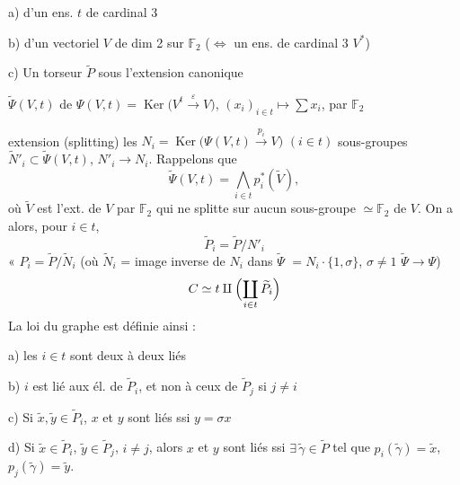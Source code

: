 \documentclass[11pt,a4paper]{article}
\begin{document}
a) d'un \struck{\ill{}} ens. $t$ de cardinal 3

b) d'un vectoriel $V$ de dim 2 sur $\mathbb{F}_2$ ($\Longleftrightarrow$ un
ens. de cardinal 3  $V^{*}$)

c) Un torseur $\widetilde{P}$ sous l'extension canonique


$\widetilde{\Psi}(V, t)$ de
$\Psi(V, t) = \operatorname{Ker}\bigl(V^{t} \xrightarrow{\varepsilon} V\bigr)$,
$(x_i)_{i \in t} \mapsto \sum x_i$, par $\mathbb{F}_2$

\ill{} extension  (splitting)  les
$N_i = \operatorname{Ker}\bigl(\Psi(V, t) \xrightarrow{p_i} V\bigr)$ $(i \in t)$
\ill{} \ill{} sous-groupes $\widetilde{N}'_i \subset \widetilde{\Psi}(V, t)$,
$N'_i \to N_i$.
Rappelons que
\[
\widetilde{\Psi}(V, t) = \bigwedge_{i \in t} p_i^{*}(\widetilde{V}),
\]
où $\widetilde{V}$ est l'ext. de $V$ par $\mathbb{F}_2$ qui ne splitte sur
aucun sous-groupe $\simeq \mathbb{F}_2$ de $V$. On a alors, pour $i \in t$,
\[
\widetilde{P}_i = \widetilde{P} / N'_i
\]
\ill{} « \quad
$P_i = \widetilde{P} / \widetilde{N}_i$ \quad (où $\widetilde{N}_i$ =
image inverse de $N_i$ dans $\widetilde{\Psi}$
$= N_i \cdot \lbrace 1, \sigma \rbrace$, $\sigma \neq 1$ 
$\widetilde{\Psi} \to \Psi$)
\[
C \simeq t \amalg \Bigl(\coprod_{i \in t} \widetilde{P}_i\Bigr)
\]
La loi du graphe est définie ainsi :

a) les $i \in t$ sont deux à deux liés

b) $i$ est lié aux él. de $\widetilde{P}_i$, et non à ceux de
$\widetilde{P}_j$ si $j \neq i$

c) Si  $\tilde{x}, \tilde{y} \in \widetilde{P}_i$,
$x$ et $y$ sont liés ssi $y = \sigma x$

d) Si $\tilde{x} \in \widetilde{P}_i$, $\tilde{y} \in \widetilde{P}_j$,
$i \neq j$, alors $x$ et $y$ sont liés ssi
$\exists\, \tilde{\gamma} \in \widetilde{P}$ tel que
$p_i(\tilde{\gamma}) = \tilde{x}$, $p_j(\tilde{\gamma}) = \tilde{y}$.
\end{document}
